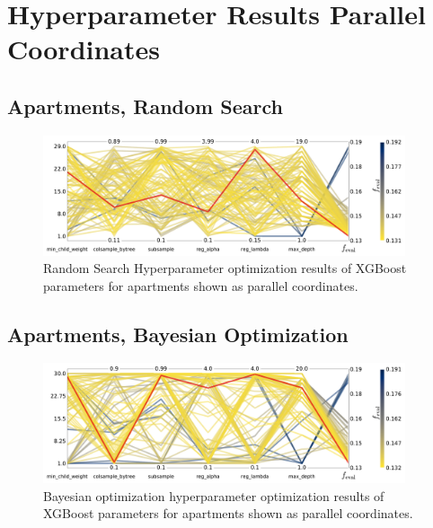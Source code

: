 \FloatBarrier
\section{Hyperparameter Results Parallel Coordinates}

\subsection*{Apartments, Random Search}
\begin{figure}[h!]
  \includegraphics[width=0.95\textwidth, trim=0 0 0 0, clip]{figures/housing/Ejerlejlighed_v19_cut_all_Ncols_all_CV_viz_HPO_RS.pdf}
  \caption[Parallel Coordinate Plot of the Hyperparameter Optimization for Apartments Using Random Search]
          {Random Search Hyperparameter optimization results of XGBoost parameters for apartments shown as parallel coordinates.} 
  \label{fig:h:CV_res_RS_parallel_coords_ejer}
\end{figure}

\FloatBarrier
\subsection*{Apartments, Bayesian Optimization}
\begin{figure}[h!]
  \includegraphics[width=0.95\textwidth, trim=0 0 0 0, clip]{figures/housing/Ejerlejlighed_v19_cut_all_Ncols_all_CV_viz_HPO_BO.pdf}
  \caption[Parallel Coordinate Plot of the Hyperparameter Optimization for Apartments Using Bayesian Optimization]
          {Bayesian optimization hyperparameter optimization results of XGBoost parameters for apartments shown as parallel coordinates.} 
  \label{fig:h:CV_res_BO_parallel_coords_ejer}
\end{figure}

